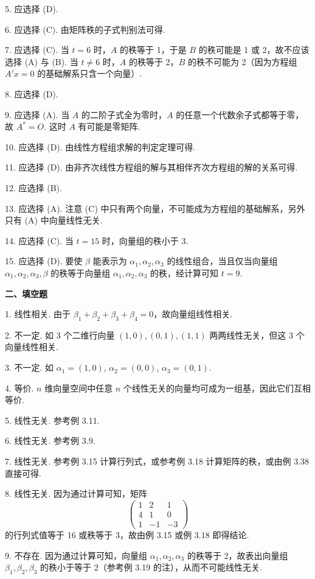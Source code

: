 \documentclass[UTF8, 12pt, fontset=fandol, oneside]{ctexart}
\begin{document}
5. 应选择 (D).

6. 应选择 (C). 由矩阵秩的子式判别法可得.

7. 应选择 (C). 当 $t=6$ 时，$A$ 的秩等于 1，于是 $B$ 的秩可能是 1 或 2，故不应该选择 (A) 与 (B). 当 $t\ne 6$ 时，$A$ 的秩等于 2，$B$ 的秩不可能为 2（因为方程组 $A'x=0$ 的基础解系只含一个向量）.

8. 应选择 (D).

9. 应选择 (A). 当 $A$ 的二阶子式全为零时，$A$ 的任意一个代数余子式都等于零，故 $A^*=O$. 这时 $A$ 有可能是零矩阵.

10. 应选择 (D). 由线性方程组求解的判定定理可得.

11. 应选择 (D). 由非齐次线性方程组的解与其相伴齐次方程组的解的关系可得.

12. 应选择 (B).

13. 应选择 (A). 注意 (C) 中只有两个向量，不可能成为方程组的基础解系，另外只有 (A) 中向量线性无关.

14. 应选择 (C). 当 $t=15$ 时，向量组的秩小于 3.

15. 应选择 (D). 要使 $\beta$ 能表示为 $\alpha_1,\alpha_2,\alpha_3$ 的线性组合，当且仅当向量组 $\alpha_1,\alpha_2,\alpha_3,\beta$ 的秩等于向量组 $\alpha_1,\alpha_2,\alpha_3$ 的秩，经计算可知 $t=9$.

\noindent\textbf{二、填空题}

1. 线性相关. 由于 $\beta_1+\beta_2+\beta_3+\beta_4=0$，故向量组线性相关.

2. 不一定. 如 3 个二维行向量 $(1,0),(0,1),(1,1)$ 两两线性无关，但这 3 个向量线性相关.

3. 不一定. 如 $\alpha_1=(1,0)$, $\alpha_2=(0,0)$, $\alpha_3=(0,1)$.

4. 等价. $n$ 维向量空间中任意 $n$ 个线性无关的向量均可成为一组基，因此它们互相等价.

5. 线性无关. 参考例 3.11.

6. 线性无关. 参考例 3.9.

7. 线性无关. 参考例 3.15 计算行列式，或参考例 3.18 计算矩阵的秩，或由例 3.38 直接可得.

8. 线性无关. 因为通过计算可知，矩阵
\[
\begin{pmatrix}
1&2&1\\
4&1&0\\
1&-1&-3
\end{pmatrix}
\]
的行列式值等于 16 或秩等于 3，故由例 3.15 或例 3.18 即得结论.

9. 不存在. 因为通过计算可知，向量组 $\alpha_1,\alpha_2,\alpha_3$ 的秩等于 2，故表出向量组 $\beta_1,\beta_2,\beta_3$ 的秩小于等于 2（参考例 3.19 的注），从而不可能线性无关.
\end{document}

